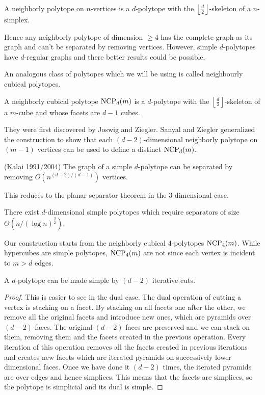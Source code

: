 \begin{definition}
 A neighborly polytope on $n$-vertices is a $d$-polytope with the $\left\lfloor 
\frac{d}{2} \right\rfloor$-skeleton of a $n$-simplex.
\end{definition}

Hence any neighborly polytope of dimension $\geq 4$ has the complete graph as 
its graph and can't be separated by removing vertices. However, simple 
$d$-polytopes have $d$-regular graphs and there better results could be 
possible. 

An analogous class of polytopes which we will be using is called neighbourly 
cubical polytopes. 

\begin{definition}
 A neighborly cubical polytope $\textrm{NCP}_d(m)$ is a $d$-polytope with the 
$\left\lfloor \frac{d}{2} 
\right\rfloor$-skeleton of a $m$-cube and whose facets are $d-1$ cubes.
\end{definition}

They were first discovered by Joswig and Ziegler. Sanyal and Ziegler 
generalized the construction to show that each $(d-2)$-dimensional neighborly 
polytope on $(m-1)$ vertices can be used to define a distinct $\textrm{NCP}_d(m)$.

\begin{conjecture}
 (Kalai 1991/2004) The graph of a simple $d$-polytope can be separated by 
removing $O(n^{(d-2)/(d-1)})$ vertices. 
\end{conjecture}

This reduces to the planar separator theorem in the 3-dimensional case. 

\begin{theorem}
 There exist $d$-dimensional simple polytopes which require separators of size 
$\Theta(n/(\log n)^{\frac{3}{2}})$.
\end{theorem}

Our construction starts from the neighborly cubical 4-polytopes $\textrm{NCP}_4(m)$. 
While hypercubes are simple polytopes, $\textrm{NCP}_4(m)$ are not since each vertex is 
incident to $m>d$ edges. 

\begin{lemma}
 A $d$-polytope can be made simple by $(d-2)$ iterative cuts.
\end{lemma}

\begin{proof}
This is easier to see in the dual case. The dual operation of cutting a vertex 
is stacking on a facet. By stacking on all facets one after the other, we 
remove all the original facets and introduce new ones, which are pyramids over 
$(d-2)$-faces. The original $(d-2)$-faces are preserved and we can stack on 
them, removing them and the facets created in the previous operation. Every 
iteration of this operation removes all the facets created in previous 
iterations and creates new facets which are iterated pyramids on successively 
lower dimensional faces. Once we have done it $(d-2)$ times, the iterated 
pyramids are over edges and hence simplices. This means that the facets are 
simplices, so the polytope is simplicial and its dual is simple.
\end{proof}

